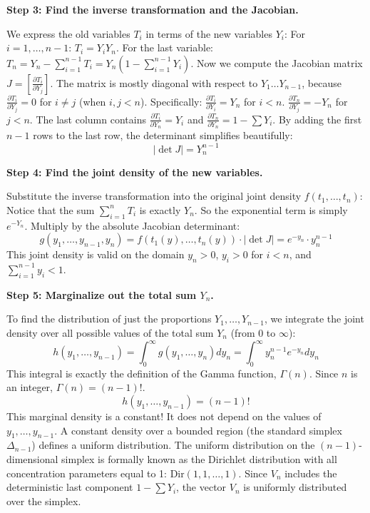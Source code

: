 \begin{solution}
\textbf{Step 3: Find the inverse transformation and the Jacobian.}

We express the old variables $T_i$ in terms of the new variables $Y_i$:
For $i = 1, \dots, n-1$: $T_i = Y_i Y_n$.
For the last variable: $T_n = Y_n - \sum_{i=1}^{n-1} T_i = Y_n \left( 1 - \sum_{i=1}^{n-1} Y_i \right)$.
Now we compute the Jacobian matrix $J = \left[ \frac{\partial T_i}{\partial Y_j} \right]$.
The matrix is mostly diagonal with respect to $Y_1 \dots Y_{n-1}$, because $\frac{\partial T_i}{\partial Y_j} = 0$ for $i \neq j$ (when $i, j < n$).
Specifically:
$\frac{\partial T_i}{\partial Y_i} = Y_n$ for $i < n$.
$\frac{\partial T_n}{\partial Y_j} = -Y_n$ for $j < n$.
The last column contains $\frac{\partial T_i}{\partial Y_n} = Y_i$ and $\frac{\partial T_n}{\partial Y_n} = 1 - \sum Y_i$.
By adding the first $n-1$ rows to the last row, the determinant simplifies beautifully:
\[ |\det J| = Y_n^{n-1} \]

\textbf{Step 4: Find the joint density of the new variables.}

Substitute the inverse transformation into the original joint density $f(t_1, \dots, t_n)$:
Notice that the sum $\sum_{i=1}^n T_i$ is exactly $Y_n$. So the exponential term is simply $e^{-Y_n}$.
Multiply by the absolute Jacobian determinant:
\[ g(y_1, \dots, y_{n-1}, y_n) = f(t_1(y), \dots, t_n(y)) \cdot |\det J| = e^{-y_n} \cdot y_n^{n-1} \]
This joint density is valid on the domain $y_n > 0$, $y_i > 0$ for $i < n$, and $\sum_{i=1}^{n-1} y_i < 1$.

\textbf{Step 5: Marginalize out the total sum $Y_n$.}

To find the distribution of just the proportions $Y_1, \dots, Y_{n-1}$, we integrate the joint density over all possible values of the total sum $Y_n$ (from 0 to $\infty$):
\[ h(y_1, \dots, y_{n-1}) = \int_0^\infty g(y_1, \dots, y_n) dy_n = \int_0^\infty y_n^{n-1} e^{-y_n} dy_n \]
This integral is exactly the definition of the Gamma function, $\Gamma(n)$. Since $n$ is an integer, $\Gamma(n) = (n-1)!$.
\[ h(y_1, \dots, y_{n-1}) = (n-1)! \]
This marginal density is a constant! It does not depend on the values of $y_1, \dots, y_{n-1}$. A constant density over a bounded region (the standard simplex $\Delta_{n-1}$) defines a uniform distribution.
The uniform distribution on the $(n-1)$-dimensional simplex is formally known as the Dirichlet distribution with all concentration parameters equal to 1: $\text{Dir}(1, 1, \dots, 1)$.
Since $V_n$ includes the deterministic last component $1 - \sum Y_i$, the vector $V_n$ is uniformly distributed over the simplex.
\end{solution}

